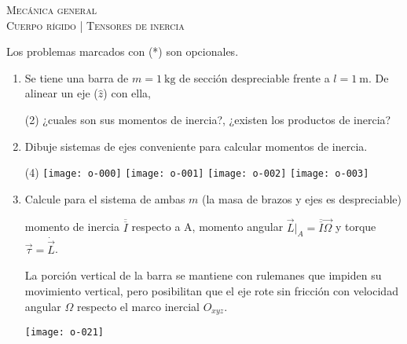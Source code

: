 \documentclass[11pt,spanish,a4paper]{article}
\begin{document}
\begin{center}
  \textsc{\large Mecánica general}\\
  \textsc{\large Cuerpo rígido | Tensores de inercia}
\end{center}

Los problemas marcados con (*) son opcionales.

\begin{enumerate}



\item Se tiene una barra de \(m= \SI{1}{\kilo\gram}\) de sección despreciable frente a \(l= \SI{1}{\metre}\).
De alinear un eje (\(\hat{z}\)) con ella, 
\begin{tasks}(2)
	\task	¿cuales son sus momentos de inercia?,
	\task ¿existen los productos de inercia? 
\end{tasks}


\item
Dibuje sistemas de ejes conveniente para calcular momentos de inercia.
\vspace{-1.1cm}
\begin{tasks}(4)
	\task \texttt{[image: o-000]}
	\task \texttt{[image: o-001]}
	\task \texttt{[image: o-002]}
	\task \texttt{[image: o-003]}
\end{tasks}



\item 
\begin{minipage}[t][4.5cm]{0.7\textwidth}
Calcule para el sistema de ambas $m$ (la masa de brazos y ejes es despreciable)
\begin{tasks} 
	\task momento de inercia \(\overline{\overline{I}}\) respecto a A,
	\task momento angular $\vec{L}\bigg\rvert_A = \overline{\overline{I}} \vec{\Omega}$ y torque $\vec{\tau} = \dot{\vec{L}}$.
\end{tasks}
La porción vertical de la barra se mantiene con rulemanes que impiden su movimiento vertical, pero posibilitan que el eje rote sin fricción con velocidad angular $\Omega$ respecto el marco inercial $O_{xyz}$.
\end{minipage}
\begin{minipage}[c][1cm][t]{0.25\textwidth}
	\texttt{[image: o-021]}
\end{minipage}




\end{enumerate}
\end{document}
